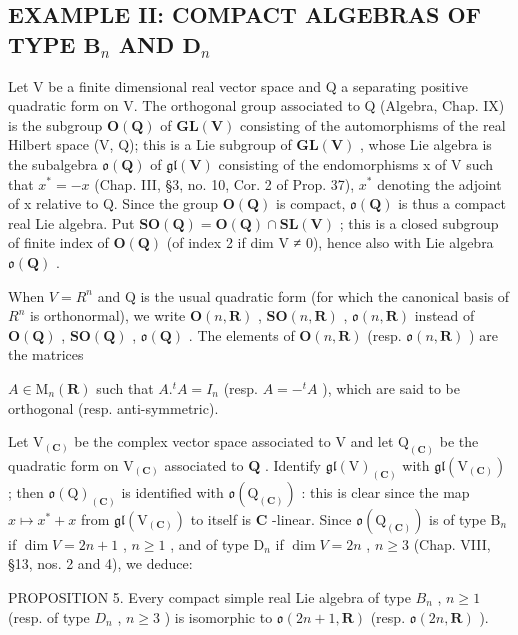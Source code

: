 \subsection{\texorpdfstring{EXAMPLE II: COMPACT ALGEBRAS OF TYPE \(\mathbf{B}_n\) AND \(\mathbf{D}_n\)}{EXAMPLE II: COMPACT ALGEBRAS OF TYPE \textbackslash mathbf\{B\}\_n AND \textbackslash mathbf\{D\}\_n}}

Let V be a finite dimensional real vector space and Q a separating positive quadratic form on V. The orthogonal group associated to Q (Algebra, Chap. IX) is the subgroup \(\mathbf{O}(\mathbf{Q})\) of \(\mathbf{GL}(\mathbf{V})\) consisting of the automorphisms of the real Hilbert space (V, Q); this is a Lie subgroup of \(\mathbf{GL}(\mathbf{V})\) , whose Lie algebra is the subalgebra \(\mathfrak{o}(\mathbf{Q})\) of \(\mathfrak{gl}(\mathbf{V})\) consisting of the endomorphisms x of V such that \(x^{*} = -x\) (Chap. III, §3, no. 10, Cor. 2 of Prop. 37), \(x^{*}\) denoting the adjoint of x relative to Q. Since the group \(\mathbf{O}(\mathbf{Q})\) is compact, \(\mathfrak{o}(\mathbf{Q})\) is thus a compact real Lie algebra. Put \(\mathbf{SO}(\mathbf{Q}) = \mathbf{O}(\mathbf{Q}) \cap \mathbf{SL}(\mathbf{V})\) ; this is a closed subgroup of finite index of \(\mathbf{O}(\mathbf{Q})\) (of index 2 if dim V ≠ 0), hence also with Lie algebra \(\mathfrak{o}(\mathbf{Q})\) .

When \(V = R^{n}\) and Q is the usual quadratic form (for which the canonical basis of \(R^{n}\) is orthonormal), we write \(\mathbf{O}(n, \mathbf{R})\) , \(\mathbf{SO}(n, \mathbf{R})\) , \(\mathfrak{o}(n, \mathbf{R})\) instead of \(\mathbf{O}(\mathbf{Q})\) , \(\mathbf{SO}(\mathbf{Q})\) , \(\mathfrak{o}(\mathbf{Q})\) . The elements of \(\mathbf{O}(n, \mathbf{R})\) (resp. \(\mathfrak{o}(n, \mathbf{R})\) ) are the matrices

\(A \in \mathrm{M}_n(\mathbf{R})\) such that \(A.^t A = I_n\) (resp. \(A = -^t A\) ), which are said to be orthogonal (resp. anti-symmetric).

Let \(\mathrm{V}_{(\mathbf{C})}\) be the complex vector space associated to \(\mathrm{V}\) and let \(\mathrm{Q}_{(\mathbf{C})}\) be the quadratic form on \(\mathrm{V}_{(\mathbf{C})}\) associated to \(\mathbf{Q}\) . Identify \(\mathfrak{gl}(\mathrm{V})_{(\mathbf{C})}\) with \(\mathfrak{gl}(\mathrm{V}_{(\mathbf{C})})\) ; then \(\mathfrak{o}(\mathrm{Q})_{(\mathbf{C})}\) is identified with \(\mathfrak{o}(\mathrm{Q}_{(\mathbf{C})})\) : this is clear since the map \(x \mapsto x^{*} + x\) from \(\mathfrak{gl}(\mathrm{V}_{(\mathbf{C})})\) to itself is \(\mathbf{C}\) -linear. Since \(\mathfrak{o}(\mathrm{Q}_{(\mathbf{C})})\) is of type \(\mathrm{B}_n\) if \(\dim V = 2n + 1\) , \(n \geq 1\) , and of type \(\mathrm{D}_n\) if \(\dim V = 2n\) , \(n \geq 3\) (Chap. VIII, §13, nos. 2 and 4), we deduce:

PROPOSITION 5. Every compact simple real Lie algebra of type \(B_{n}\) , \(n \geq 1\) (resp. of type \(D_{n}\) , \(n \geq 3\) ) is isomorphic to \(\mathfrak{o}(2n + 1, \mathbf{R})\) (resp. \(\mathfrak{o}(2n, \mathbf{R})\) ).

